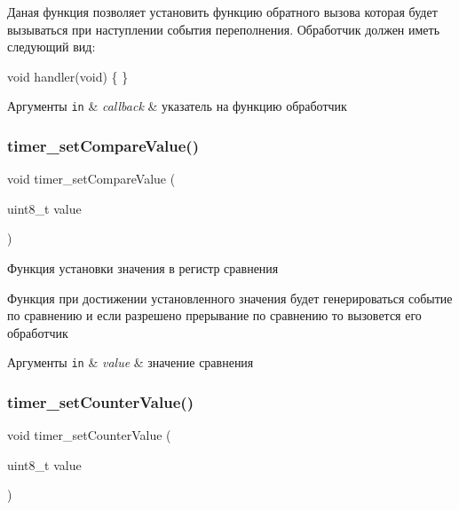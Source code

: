 Даная функция позволяет установить функцию обратного вызова которая будет вызываться при наступлении события переполнения. Обработчик должен иметь следующий вид\+: 
\begin{DoxyCode}
\textcolor{keywordtype}{void} handler(\textcolor{keywordtype}{void})
\{ 
\}
\end{DoxyCode}
 
\begin{DoxyParams}[1]{Аргументы}
\mbox{\tt in}  & {\em callback} & указатель на функцию обработчик \\
\hline
\end{DoxyParams}
\mbox{\label{group__timer_counter_gafee8b515db2ba6289144f4c927448731}} 
\subsubsection{\texorpdfstring{timer\+\_\+set\+Compare\+Value()}{timer\_setCompareValue()}}
{\footnotesize\ttfamily void timer\+\_\+set\+Compare\+Value (\begin{DoxyParamCaption}\item[{uint8\+\_\+t}]{value }\end{DoxyParamCaption})}



Функция установки значения в регистр сравнения 

Функция при достижении установленного значения будет генерироваться событие по сравнению и если разрешено прерывание по сравнению то вызовется его обработчик ~\newline

\begin{DoxyParams}[1]{Аргументы}
\mbox{\tt in}  & {\em value} & значение сравнения \\
\hline
\end{DoxyParams}
\mbox{\label{group__timer_counter_ga04ad8cb0a5f2fbb3bb7f544ba86de5d7}} 
\subsubsection{\texorpdfstring{timer\+\_\+set\+Counter\+Value()}{timer\_setCounterValue()}}
{\footnotesize\ttfamily void timer\+\_\+set\+Counter\+Value (\begin{DoxyParamCaption}\item[{uint8\+\_\+t}]{value }\end{DoxyParamCaption})}



